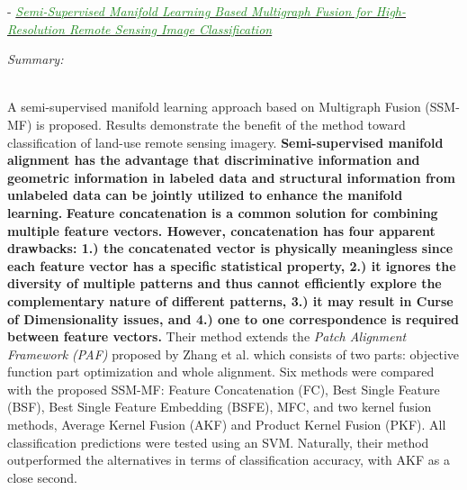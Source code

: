 \documentclass[]{article}
\newcommand{\paperentry}[4]{
            \hangindent=1cm
            \textcolor{red}{\cite{#1}} - \href{run:../References/#3}{\textcolor{ForestGreen}{\textit{#2}}}
            
            \noindent            
            \begin{minipage}[t]{0.1\linewidth}\hfill\end{minipage}
            \begin{minipage}[t]{0.8\linewidth}\textcolor{NavyBlue}{{\textit{Summary:}}}#4\end{minipage}
            \vspace{.25cm}
          }
\begin{document}
		\paperentry{Zhang2014SemiSupManLearningFusion}
		{Semi-Supervised Manifold Learning Based Multigraph Fusion for High-Resolution Remote Sensing Image Classification}
		{Manifold_Representation_Learning/Alignment/Zhang2014SemiSupManLearningFusion.pdf}
		{}\\
		A semi-supervised manifold learning approach based on Multigraph Fusion (SSM-MF) is proposed.  Results demonstrate the benefit of the method toward classification of land-use remote sensing imagery. \textbf{Semi-supervised manifold alignment has the advantage that  discriminative information and geometric information in labeled data and structural information from unlabeled data can be jointly utilized to enhance the manifold learning.}  \textbf{Feature concatenation is a common solution for combining multiple feature vectors.  However, concatenation has four apparent drawbacks: 1.) the concatenated vector is physically meaningless since each feature vector has a specific statistical property, 2.) it ignores the diversity of multiple patterns and thus cannot efficiently explore the complementary nature of different patterns, 3.) it may result in Curse of Dimensionality issues, and 4.) one to one correspondence is required between feature vectors.}  Their method extends the \textit{Patch Alignment Framework (PAF)} proposed by Zhang et al. which consists of two parts: objective function part optimization and whole alignment.  Six methods were compared with the proposed SSM-MF: Feature Concatenation (FC), Best Single Feature (BSF), Best Single Feature Embedding (BSFE), MFC, and two kernel fusion methods, Average Kernel Fusion (AKF) and Product Kernel Fusion (PKF).  All classification predictions were tested using an SVM.  Naturally, their method outperformed the alternatives in terms of classification accuracy, with AKF as a close second.
		
\end{document}
